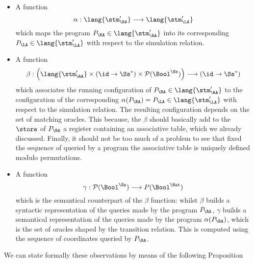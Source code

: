 \begin{itemize}
  \item A function
  $$
  \alpha: \lang{\stm_\RA'}
  \longrightarrow
  \lang{\stm_\LA'}
  $$
  which maps the program $P_\RA \in \lang{\stm_\RA'}$ into its
  corresponding $P_\LA \in \lang{\stm_\LA'}$ with respect to
  the simulation relation.
  \item A function
  $$
  \beta:\left(\lang {\stm_\RA'}\times\left(\id\to{\Ss^*}\right)\times \mathcal P (\Bool^\Ss) \right)
  \longrightarrow
  \left(\id\to{\Ss^*}\right)
  $$
  which associates the running configuration of $P_\RA \in \lang{\stm_\RA'}$
  to the configuration of the corresponding $\alpha(P_\RA)=P_\LA \in \lang{\stm_\LA'}$
  with respect to the simulation relation.
  The resulting configuration depends on the set of matching oracles.
  This  because, the $\beta$ should
  basically add to the $\store$ of $P_\RA$ a register containing
  an associative table, which we already discussed.
  Finally, it should not be too much of a problem
  to see that fixed the sequence of queried by a program
  the associative table is uniquely defined modulo permutations.
  \item A function
  $$
  \gamma:\mathcal P (\Bool^\Ss)
  \longrightarrow
  P (\Bool^\Nat)
  $$
  which is the semantical counterpart of the $\beta$ function: whilst $\beta$
  builds a syntactic representation of the queries made by the program $P_\RA$,
  $\gamma$ builds a semantical representation of the queries made by the program
  $\alpha(P_\RA)$, which is the set of oracles
  shaped by the transition relation. This is computed using the sequence of
  coordinates queried by $P_\RA$.
\end{itemize}

We can state formally these observations by means of the following Proposition

